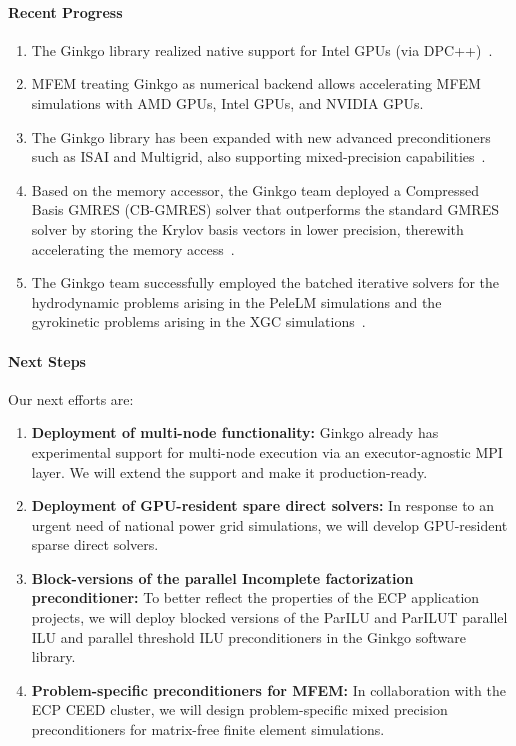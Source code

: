 \paragraph{Recent Progress}
\begin{enumerate}
  \item The Ginkgo library realized native support for Intel GPUs (via
		DPC++)~\cite{tsai2021porting}.
  \item MFEM treating Ginkgo as numerical backend allows accelerating MFEM
		simulations with AMD GPUs, Intel GPUs, and NVIDIA GPUs.
  \item The Ginkgo library has been expanded with new advanced preconditioners
		such as ISAI and Multigrid, also supporting mixed-precision capabilities~\cite{10.1007/978-3-030-85665-6_34}.
  \item Based on the memory accessor, the Ginkgo team deployed a Compressed
		Basis GMRES (CB-GMRES) solver that outperforms the standard GMRES solver
		by storing the Krylov basis vectors in lower precision, therewith
		accelerating the memory access~\cite{DBLP:journals/corr/abs-2009-12101}.
  \item The Ginkgo team successfully employed the batched iterative solvers for
		the hydrodynamic problems arising in the PeleLM
		simulations and the gyrokinetic problems arising in the
		XGC simulations~\cite{batched-scala2021}.
\end{enumerate}


\paragraph{Next Steps}
Our next efforts are:
\begin{enumerate}
  \item \textbf{Deployment of multi-node functionality:} Ginkgo already has
		experimental support for multi-node execution via an executor-agnostic
		MPI layer. We will extend the support and make it production-ready.
  \item \textbf{Deployment of GPU-resident spare direct solvers:} In response to
		an urgent need of national power grid simulations, we will develop
		GPU-resident sparse direct solvers.
  \item \textbf{Block-versions of the parallel Incomplete factorization
		preconditioner:} To better reflect the properties of the ECP application
		projects, we will deploy blocked versions of the ParILU and ParILUT
		parallel ILU and parallel threshold ILU preconditioners in the Ginkgo
		software library.
  \item \textbf{Problem-specific preconditioners for MFEM:} In collaboration
		with the ECP CEED cluster, we will design problem-specific mixed
		precision preconditioners for matrix-free finite element simulations.
\end{enumerate}


